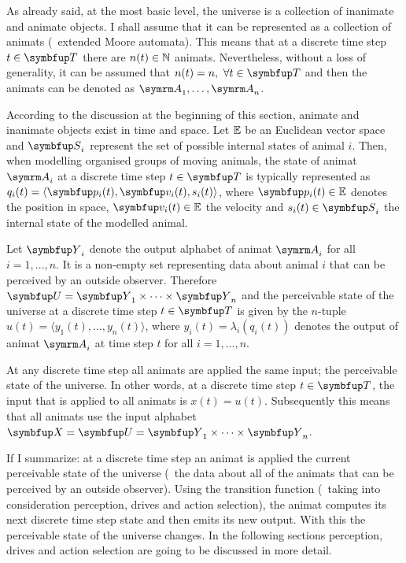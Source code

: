 As already said, at the most basic level, the universe is a collection of inanimate and animate objects. I shall assume that it can be represented as a collection of animats (\ie\ extended Moore automata). This means that at a discrete time step $t \in \set{T}$ there are $n(t) \in \mathbb{N}$ animats. Nevertheless, without a loss of generality, it can be assumed that $n(t)=n,\ \forall t \in \set{T}$ and then the animats can be denoted as $\autom{A}_1,\ldots,\autom{A}_n$.

According to the discussion at the beginning of this section, animate and inanimate objects exist in time and space. Let $\mathbb{E}$ be an Euclidean vector space and $\set{S}_i$ represent the set of possible internal states of animal $i$. Then, when modelling organised groups of moving animals, the state of animat $\autom{A}_i$ at a discrete time step $t \in \set{T}$ is typically represented as $q_i(t)=\langle \vect{p}_i(t), \vect{v}_i(t), s_i(t) \rangle$, where $\vect{p}_i(t) \in \E$ denotes the position in space, $\vect{v}_i(t) \in \E$ the velocity and $s_i(t) \in \set{S}_i$ the internal state of the modelled animal.

Let $\set{Y}_i$ denote the output alphabet of animat $\autom{A}_i$ for all $i=1,\ldots,n$. It is a non-empty set representing data about animal $i$ that can be perceived by an outside observer. Therefore $\set{U}=\set{Y}_1 \times \cdots \times \set{Y}_n$ and the perceivable state of the universe at a discrete time step $t \in \set{T}$ is given by the $n$-tuple $u(t)=\langle y_1(t),\ldots,y_n(t)\rangle$, where $y_i(t)=\lambda_i(q_i(t))$ denotes the output of animat $\autom{A}_i$ at time step $t$ for all $i=1,\ldots,n$.

At any discrete time step all animats are applied the same input; the perceivable state of the universe. In other words, at a discrete time step $t \in \set{T}$, the input that is applied to all animats is $x(t)=u(t)$. Subsequently this means that all animats use the input alphabet $\set{X}=\set{U}=\set{Y}_1 \times \cdots \times \set{Y}_n$.

If I summarize: at a discrete time step an animat is applied the current perceivable state of the universe (\ie\ the data about all of the animats that can be perceived by an outside observer). Using the transition function (\ie\ taking into consideration perception, drives and action selection), the animat computes its next discrete time step state and then emits its new output. With this the perceivable state of the universe changes. In the following sections perception, drives and action selection are going to be discussed in more detail.

